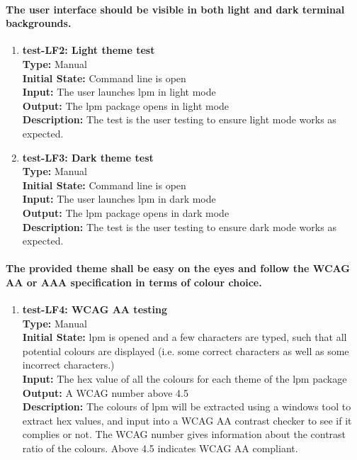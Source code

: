\documentclass[12pt, titlepage]{article}
\begin{document}
\paragraph{The user interface should be visible in both light and dark terminal backgrounds.}
\begin{enumerate}
    \item{\textbf{test-LF2: Light theme test}\\}
    \textbf{Type:} Manual\\
    \textbf{Initial State:}  Command line is open\\
    \textbf{Input:} The user launches lpm in light mode\\
    \textbf{Output:} The lpm package opens in light mode\\
    \textbf{Description:}  The test is the user testing to ensure light mode works as expected. \\

    \item{\textbf{test-LF3: Dark theme test}\\}
    \textbf{Type:} Manual\\
    \textbf{Initial State:}  Command line is open\\
    \textbf{Input:} The user launches lpm in dark mode\\
    \textbf{Output:} The lpm package opens in dark mode\\
    \textbf{Description:}  The test is the user testing to ensure dark mode works as expected. \\
\end{enumerate}

\paragraph{The provided theme shall be easy on the eyes and follow the WCAG AA or AAA
specification in terms of colour choice.}
\begin{enumerate}
    \item{\textbf{test-LF4: WCAG AA testing}\\}
    \textbf{Type:} Manual\\
    \textbf{Initial State:}  lpm is opened and a few characters are typed, such that all potential colours are displayed (i.e. some correct characters as well as some incorrect characters.)\\
    \textbf{Input:} The hex value of all the colours for each theme of the lpm package\\
    \textbf{Output:} A WCAG number above 4.5\\
    \textbf{Description:}  The colours of lpm will be extracted using a windows tool to extract hex values, and input into a WCAG AA contrast checker to see if it complies or not. The WCAG number gives information about the contrast ratio of the colours. Above 4.5 indicates WCAG AA compliant. \\
\end{enumerate}
\end{document}

